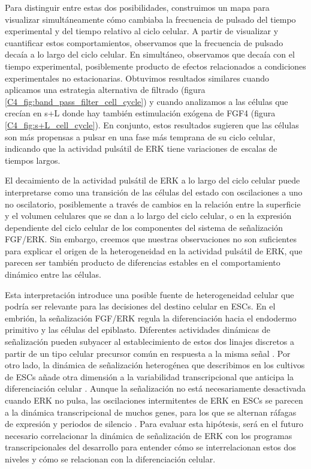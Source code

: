 \documentclass[./main.tex]{subfiles}
\begin{document}
Para distinguir entre estas dos posibilidades, construimos un mapa para visualizar simultáneamente cómo cambiaba la frecuencia de pulsado del tiempo experimental y del tiempo relativo al ciclo celular. A partir de visualizar y cuantificar estos comportamientos, observamos que la frecuencia de pulsado decaía a lo largo del ciclo celular. En simultáneo, observamos que decaía con el tiempo experimental, posiblemente producto de efectos relacionados a condiciones experimentales no estacionarias. Obtuvimos resultados similares cuando aplicamos una estrategia alternativa de filtrado (figura \ref{C4_fig:band_pass_filter_cell_cycle}) y cuando analizamos a las células que crecían en s+L donde hay también estimulación exógena de FGF4 (figura \ref{C4_fig:s+L_cell_cycle}). En conjunto, estos resultados sugieren que las células son más propensas a pulsar en una fase más temprana de su ciclo celular, indicando que la actividad pulsátil de ERK tiene variaciones de escalas de tiempos largos.


El decaimiento de la actividad pulsátil de ERK a lo largo del ciclo celular puede interpretarse como una transición de las células del estado con oscilaciones a uno no oscilatorio, posiblemente a través de cambios en la relación entre la superficie y el volumen celulares que se dan a lo largo del ciclo celular, o en la expresión dependiente del ciclo celular de los componentes del sistema de señalización FGF/ERK. Sin embargo, creemos que nuestras observaciones no son suficientes para explicar el origen de la heterogeneidad en la actividad pulsátil de ERK, que parecen ser también producto de diferencias estables en el comportamiento dinámico entre las células. 

Esta interpretación introduce una posible fuente de heterogeneidad celular que podría ser relevante para las decisiones del destino celular en ESCs. En el embrión, la señalización FGF/ERK regula la diferenciación hacia el endodermo primitivo y las células del epiblasto. Diferentes actividades dinámicas de señalización pueden subyacer al establecimiento de estos dos linajes discretos a partir de un tipo celular precursor común en respuesta a la misma señal \cite{Pokrass2020}. Por otro lado, la dinámica de señalización heterogénea que describimos en los cultivos de ESCs añade otra dimensión a la variabilidad transcripcional que anticipa la diferenciación celular \cite{Canham2010,Chambers2007,Hayashi2008,Singh2007,Toyooka2008}. Aunque la señalización no está necesariamente desactivada cuando ERK no pulsa, las oscilaciones intermitentes de ERK en ESCs se parecen a la dinámica transcripcional de muchos genes, para los que se alternan ráfagas de expresión y periodos de silencio \cite{Tunnacliffe2020}. Para evaluar esta hipótesis, será en el futuro necesario correlacionar la dinámica de señalización de ERK con los programas transcripcionales del desarrollo para entender cómo se interrelacionan estos dos niveles y cómo se relacionan con la diferenciación celular.

 
\end{document}
